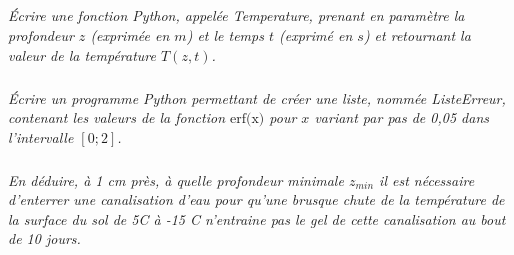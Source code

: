 \documentclass[10pt,oneside]{article}
\begin{document}
\subparagraph{}
\textit{Écrire une fonction Python, appelée Temperature, prenant en paramètre la profondeur $z$ (exprimée
en $m$) et le temps $t$ (exprimé en $s$) et retournant la valeur de la température $T(z, t)$.}

\subparagraph{}
\textit{Écrire un programme Python permettant de créer une liste, nommée ListeErreur, contenant les
valeurs de la fonction $\text{erf(x)}$ pour $x$ variant par pas de 0,05 dans l’intervalle $[0 ; 2]$.}

\subparagraph{}
\textit{En déduire, à 1 cm près, à quelle profondeur minimale $z_{min}$ il est nécessaire d’enterrer une
canalisation d’eau pour qu’une brusque chute de la température de la surface du sol de 5\textdegree C à -15 \textdegree C
n’entraine pas le gel de cette canalisation au bout de 10 jours.}
\end{document}
